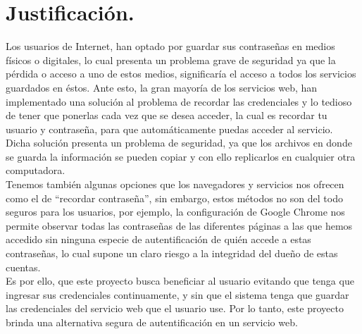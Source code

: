\documentclass[12pt, a4paper, titlepage]{report}
\begin{document}
	\section{Justificación.}
	    Los usuarios de Internet, han optado por guardar sus contraseñas en medios físicos o digitales, lo cual presenta un problema grave de seguridad ya que la pérdida o acceso a uno de estos medios, significaría el acceso a todos los servicios guardados en éstos. Ante esto, la gran mayoría de los servicios web, han implementado una solución al problema de recordar las credenciales y lo tedioso de tener que ponerlas cada vez que se desea acceder, la cual es recordar tu usuario y contraseña, para que automáticamente puedas acceder al servicio. Dicha solución presenta un problema de seguridad, ya que los archivos en donde se guarda la información se pueden copiar y con ello replicarlos en cualquier otra computadora.\\
	    
        Tenemos también algunas opciones que los navegadores y servicios nos ofrecen como el de “recordar contraseña”, sin embargo, estos métodos no son del todo seguros para los usuarios, por ejemplo, la configuración de Google Chrome nos permite observar todas las contraseñas de las diferentes páginas a las que hemos accedido sin ninguna especie de autentificación de quién accede a estas contraseñas, lo cual supone un claro riesgo a la integridad del dueño de estas cuentas.\\
        
        Es por ello, que este proyecto busca beneficiar al usuario evitando que tenga que ingresar sus credenciales continuamente, y sin que el sistema tenga que guardar las credenciales del servicio web que el usuario use. Por lo tanto, este proyecto brinda una alternativa segura de autentificación en un servicio web. \\
        
\end{document}

